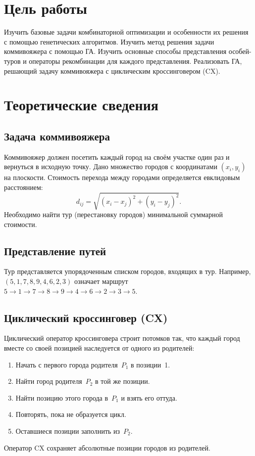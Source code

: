 \documentclass[14pt,a4paper]{extarticle}
\begin{document}

\tableofcontents

\newpage

\section{Цель работы}

Изучить базовые задачи комбинаторной оптимизации и особенности их решения с помощью генетических алгоритмов. Изучить метод решения задачи коммивояжера с помощью ГА. Изучить основные способы представления особей-туров и операторы рекомбинации для каждого представления. Реализовать ГА, решающий задачу коммивояжера с циклическим кроссинговером (CX).

\section{Теоретические сведения}

\subsection{Задача коммивояжера}

Коммивояжер должен посетить каждый город на своём участке один раз и вернуться в исходную точку. Дано множество городов с координатами $(x_i, y_i)$ на плоскости. Стоимость перехода между городами определяется евклидовым расстоянием:
\begin{equation}
d_{ij} = \sqrt{(x_i - x_j)^2 + (y_i - y_j)^2}.
\end{equation}
Необходимо найти тур (перестановку городов) минимальной суммарной стоимости.

\subsection{Представление путей}

Тур представляется упорядоченным списком городов, входящих в тур. Например, $(5, 1, 7, 8, 9, 4, 6, 2, 3)$ означает маршрут $5 \to 1 \to 7 \to 8 \to 9 \to 4 \to 6 \to 2 \to 3 \to 5$.

\subsection{Циклический кроссинговер (CX)}

Циклический оператор кроссинговера строит потомков так, что каждый город вместе со своей позицией наследуется от одного из родителей:
\begin{enumerate}
\item Начать с первого города родителя~$P_1$ в позиции~1.
\item Найти город родителя~$P_2$ в той же позиции.
\item Найти позицию этого города в~$P_1$ и взять его оттуда.
\item Повторять, пока не образуется цикл.
\item Оставшиеся позиции заполнить из~$P_2$.
\end{enumerate}
Оператор CX сохраняет абсолютные позиции городов из родителей.
\end{document}
